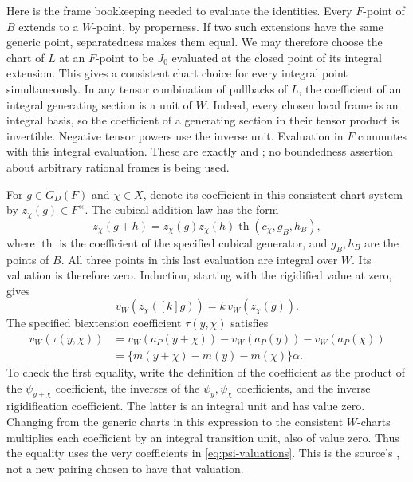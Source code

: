 Here is the frame bookkeeping needed to evaluate the identities.
Every \(F\)-point of \(B\) extends to a \(W\)-point, by properness.
If two such extensions have the same generic point, separatedness
makes them equal.  We may therefore choose the chart of \(L\) at an
\(F\)-point to be \(J_0\) evaluated at the closed point of its integral
extension.  This gives a consistent chart choice for every integral
point simultaneously.  In any tensor combination of pullbacks of \(L\),
the coefficient of an integral generating section is a unit of \(W\).
Indeed, every chosen local frame is an integral basis, so the
coefficient of a generating section in their tensor product is
invertible.  Negative tensor powers use the inverse unit.  Evaluation
in \(F\) commutes with this integral evaluation.  These are exactly
 and ; no boundedness
assertion about arbitrary rational frames is being used.

For \(g\in\widetilde G_D(F)\) and \(\chi\in X\), denote its coefficient
in this consistent chart system by \(z_\chi(g)\in F^\times\).
The cubical addition law has the form
\[
 z_\chi(g+h)
  =z_\chi(g)z_\chi(h)
     \operatorname{th}(c_\chi,g_B,h_B),
\]
where \(\operatorname{th}\) is the coefficient of the specified
cubical generator, and \(g_B,h_B\) are the points of \(B\).
All three points in this last evaluation are integral over \(W\).
Its valuation is therefore zero.  Induction, starting with the
rigidified value at zero, gives
\[
                  v_W(z_\chi([k]g))
                     =k\,v_W(z_\chi(g)).
 \tag{PU4}\label{eq:psi-nsmul-value}
\]
The specified biextension coefficient \(\tau(y,\chi)\) satisfies
\[
 \begin{split}
 v_W(\tau(y,\chi))
   &=v_W(a_P(y+\chi))-v_W(a_P(y))-v_W(a_P(\chi))\\
   &=\{m(y+\chi)-m(y)-m(\chi)\}\alpha .
 \end{split}
 \tag{PU5}\label{eq:psi-tau-value}
\]
To check the first equality, write the definition of the coefficient
as the product of the \(\psi_{y+\chi}\) coefficient, the inverses of the
\(\psi_y,\psi_\chi\) coefficients, and the inverse rigidification
coefficient.  The latter is an integral unit and has value zero.
Changing from the generic charts in this expression to the consistent
\(W\)-charts multiplies each coefficient by an integral transition
unit, also of value zero.  Thus the equality uses the very
coefficients in \eqref{eq:psi-valuations}.  This is the source's
, not a new pairing chosen to have that valuation.


